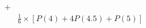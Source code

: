 \documentclass[preview]{standalone}
\begin{document}
\begin{align*}
+&\\&\frac{1}{6}\times[P(4)+4P(4.5)+P(5)]
\end{align*}
\end{document}
